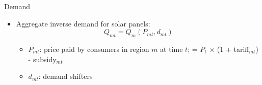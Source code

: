 \documentclass[xcolor=dvipsnames,envcountsect]{beamer}
\begin{document}
    
    
    
    
    
    

\begin{frame}{Demand}
\begin{itemize}
   \item Aggregate inverse demand for solar panels:
        \begin{equation}
          Q_{mt}=Q_{m}(P_{mt},d_{mt})
        \end{equation}
    \begin{itemize}
        \item $P_{mt}$: price paid by consumers in region $m$ at time $t$; = $P_t$ $\times$ (1 + tariff$_{mt}$) - subsidy$_{mt}$
        \item $d_{mt}$: demand shifters
    \end{itemize}
 \end{itemize}

\end{frame}
\end{document}

